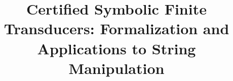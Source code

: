 \documentclass[sigplan,10pt,anonymous,review]{acmart}\settopmatter{printfolios=true,printccs=false,printacmref=false}
\begin{document}
\setlength{\pdfpageheight}{\paperheight}
\setlength{\pdfpagewidth}{\paperwidth}



\title{Certified Symbolic Finite Transducers: Formalization and Applications to String Manipulation}



\maketitle
















\end{document}
